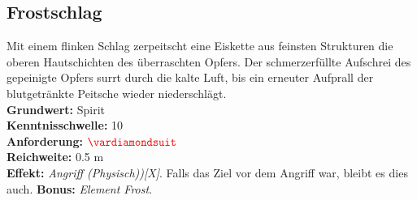 \subsection*{Frostschlag} \label{sk:frostschlag}
Mit einem flinken Schlag zerpeitscht eine Eiskette aus feinsten Strukturen die oberen Hautschichten des überraschten Opfers. Der schmerzerfüllte Aufschrei des gepeinigte Opfers surrt durch die kalte Luft, bis ein erneuter Aufprall der blutgetränkte Peitsche wieder niederschlägt.\\
\textbf{Grundwert:} Spirit\\
\textbf{Kenntnisschwelle:} 10 \\
\textbf{Anforderung:} $\Karo{}$ \\
\textbf{Reichweite:} 0.5 m \\
\textbf{Effekt:} \textit{Angriff (Physisch))[X]}. Falls das Ziel vor dem Angriff \textit{} war, bleibt es dies auch. \textbf{Bonus:} \textit{Element Frost}.

